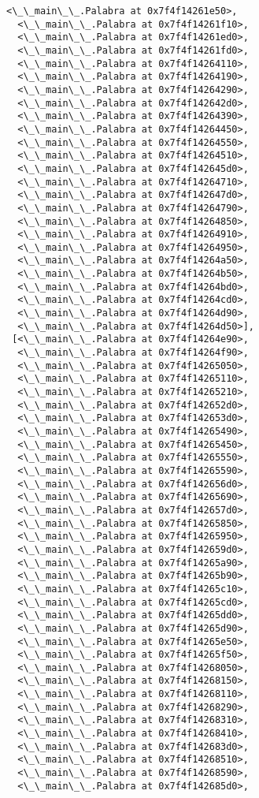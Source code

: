 \documentclass[12pt,a4paper,table]{article}
\begin{document}
\begin{tcolorbox}[breakable, size=fbox, boxrule=.5pt, pad at break*=1mm, opacityfill=0]
\begin{Verbatim}[commandchars=\\\{\}]
  <\_\_main\_\_.Palabra at 0x7f4f14261e50>,
  <\_\_main\_\_.Palabra at 0x7f4f14261f10>,
  <\_\_main\_\_.Palabra at 0x7f4f14261ed0>,
  <\_\_main\_\_.Palabra at 0x7f4f14261fd0>,
  <\_\_main\_\_.Palabra at 0x7f4f14264110>,
  <\_\_main\_\_.Palabra at 0x7f4f14264190>,
  <\_\_main\_\_.Palabra at 0x7f4f14264290>,
  <\_\_main\_\_.Palabra at 0x7f4f142642d0>,
  <\_\_main\_\_.Palabra at 0x7f4f14264390>,
  <\_\_main\_\_.Palabra at 0x7f4f14264450>,
  <\_\_main\_\_.Palabra at 0x7f4f14264550>,
  <\_\_main\_\_.Palabra at 0x7f4f14264510>,
  <\_\_main\_\_.Palabra at 0x7f4f142645d0>,
  <\_\_main\_\_.Palabra at 0x7f4f14264710>,
  <\_\_main\_\_.Palabra at 0x7f4f142647d0>,
  <\_\_main\_\_.Palabra at 0x7f4f14264790>,
  <\_\_main\_\_.Palabra at 0x7f4f14264850>,
  <\_\_main\_\_.Palabra at 0x7f4f14264910>,
  <\_\_main\_\_.Palabra at 0x7f4f14264950>,
  <\_\_main\_\_.Palabra at 0x7f4f14264a50>,
  <\_\_main\_\_.Palabra at 0x7f4f14264b50>,
  <\_\_main\_\_.Palabra at 0x7f4f14264bd0>,
  <\_\_main\_\_.Palabra at 0x7f4f14264cd0>,
  <\_\_main\_\_.Palabra at 0x7f4f14264d90>,
  <\_\_main\_\_.Palabra at 0x7f4f14264d50>],
 [<\_\_main\_\_.Palabra at 0x7f4f14264e90>,
  <\_\_main\_\_.Palabra at 0x7f4f14264f90>,
  <\_\_main\_\_.Palabra at 0x7f4f14265050>,
  <\_\_main\_\_.Palabra at 0x7f4f14265110>,
  <\_\_main\_\_.Palabra at 0x7f4f14265210>,
  <\_\_main\_\_.Palabra at 0x7f4f142652d0>,
  <\_\_main\_\_.Palabra at 0x7f4f142653d0>,
  <\_\_main\_\_.Palabra at 0x7f4f14265490>,
  <\_\_main\_\_.Palabra at 0x7f4f14265450>,
  <\_\_main\_\_.Palabra at 0x7f4f14265550>,
  <\_\_main\_\_.Palabra at 0x7f4f14265590>,
  <\_\_main\_\_.Palabra at 0x7f4f142656d0>,
  <\_\_main\_\_.Palabra at 0x7f4f14265690>,
  <\_\_main\_\_.Palabra at 0x7f4f142657d0>,
  <\_\_main\_\_.Palabra at 0x7f4f14265850>,
  <\_\_main\_\_.Palabra at 0x7f4f14265950>,
  <\_\_main\_\_.Palabra at 0x7f4f142659d0>,
  <\_\_main\_\_.Palabra at 0x7f4f14265a90>,
  <\_\_main\_\_.Palabra at 0x7f4f14265b90>,
  <\_\_main\_\_.Palabra at 0x7f4f14265c10>,
  <\_\_main\_\_.Palabra at 0x7f4f14265cd0>,
  <\_\_main\_\_.Palabra at 0x7f4f14265dd0>,
  <\_\_main\_\_.Palabra at 0x7f4f14265d90>,
  <\_\_main\_\_.Palabra at 0x7f4f14265e50>,
  <\_\_main\_\_.Palabra at 0x7f4f14265f50>,
  <\_\_main\_\_.Palabra at 0x7f4f14268050>,
  <\_\_main\_\_.Palabra at 0x7f4f14268150>,
  <\_\_main\_\_.Palabra at 0x7f4f14268110>,
  <\_\_main\_\_.Palabra at 0x7f4f14268290>,
  <\_\_main\_\_.Palabra at 0x7f4f14268310>,
  <\_\_main\_\_.Palabra at 0x7f4f14268410>,
  <\_\_main\_\_.Palabra at 0x7f4f142683d0>,
  <\_\_main\_\_.Palabra at 0x7f4f14268510>,
  <\_\_main\_\_.Palabra at 0x7f4f14268590>,
  <\_\_main\_\_.Palabra at 0x7f4f142685d0>,

\end{Verbatim}
\end{tcolorbox}
\end{document}
